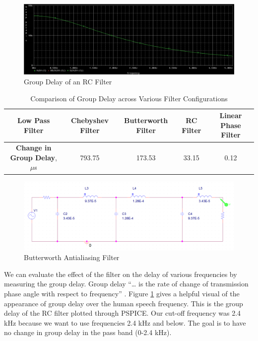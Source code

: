 \documentclass[10pt,journal,compsoc]{IEEEtran}
\begin{document}
\begin{figure}[t]
    \centering
    \includegraphics[width=6in]{group_delay}
    \caption{Group Delay of an RC Filter}
    \label{fig:group_delay}
\end{figure}
\begin{table}[t]
    \centering
    \begin{tabular}{|c|c|c|c|c|}
    \hline
        \textbf{Low Pass Filter} & Chebyshev Filter & Butterworth Filter & RC Filter & Linear Phase Filter\\
    \hline
            \textbf{Change in Group Delay}, $\mu$s & 793.75 & 173.53 & 33.15 & 0.12\\
            \hline
    \end{tabular}
    \caption{Comparison of Group Delay across Various Filter Configurations}
    \label{tab:group_delay}
\end{table}

\begin{figure}[t]
    \centering
    \includegraphics[width=6in]{filter}
    \caption{Butterworth Antialiasing Filter}
    \label{fig:filter}
\end{figure}

We can evaluate the effect of the filter on the delay of various frequencies by measuring the group delay.  Group delay “… is the rate of change of transmission phase angle with respect to frequency” \cite{group_delay}. Figure \ref{fig:group_delay} gives a helpful visual of the appearance of group delay over the human speech frequency. This is the group delay of the RC filter plotted through PSPICE. Our cut-off frequency was 2.4 kHz because we want to use frequencies 2.4 kHz and below. The goal is to have no change in group delay in the pass band (0-2.4 kHz).
\end{document}
